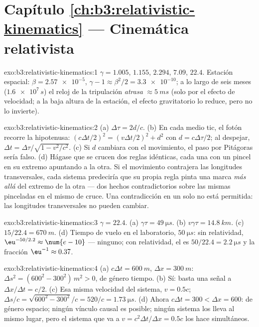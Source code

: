 \section*{Capítulo \ref{ch:b3:relativistic-kinematics} --- Cinemática relativista}

\begin{solution}{exo:b3:relativistic-kinematics:1}
$\gamma = 1.005$, $1.155$, $2.294$, $7.09$, $22.4$. Estación espacial: $\beta =
\num{2.57e-5}$, $\gamma - 1 \approx \beta^2/2 = \num{3.3e-10}$; a lo
largo de seis meses ($\num{1.6e7}{}\,\unit{s}$) el reloj de la tripulación
\emph{atrasa} $\approx\qty{5}{ms}$ (solo por el efecto de velocidad; a la
baja altura de la estación, el efecto gravitatorio lo reduce, pero no lo
invierte).
\end{solution}

\begin{solution}{exo:b3:relativistic-kinematics:2}
(a) $\Delta\tau = 2d/c$. (b) En cada medio tic, el fotón recorre la
hipotenusa: $(c\Delta t/2)^2 = (v\Delta t/2)^2 + d^2$ con $d =
c\Delta\tau/2$; al despejar, $\Delta t = \Delta\tau/\sqrt{1 - v^2/c^2}$. (c)
Si $d$ cambiara con el movimiento, el paso por Pitágoras sería falso. (d)
Hágase que se crucen dos reglas idénticas, cada una con un pincel en su
extremo apuntando a la otra. Si el movimiento contrajera las longitudes
transversales, cada sistema predeciría que su propia regla pinta una marca
\emph{más allá} del extremo de la otra --- dos hechos contradictorios sobre
las mismas pinceladas en el mismo  de cruce. Una contradicción en un
solo  no está permitida: las longitudes transversales no pueden
cambiar.
\end{solution}

\begin{solution}{exo:b3:relativistic-kinematics:3}
$\gamma = 22.4$. (a) $\gamma\tau = \qty{49}{\micro s}$. (b) $v\gamma
\tau = \qty{14.8}{km}$. (c) $15/22.4 = \qty{670}{m}$. (d) Tiempo de vuelo en
el laboratorio, $\qty{50}{\micro s}$: sin relatividad,
$\eu^{-50/2.2} \approx \num{e-10}$ --- ninguno; con relatividad, el
 es $50/22.4 = \qty{2.2}{\micro s}$ y la fracción $\eu^{-1}
\approx 0.37$.
\end{solution}

\begin{solution}{exo:b3:relativistic-kinematics:4}
(a) $c\Delta t = \qty{600}{m}$, $\Delta x = \qty{300}{m}$: $\Delta s^2
= (600^2 - 300^2)\,\unit{m^2} > 0$, de género tiempo. (b) Sí: basta una
señal a $\Delta x/\Delta t = c/2$. (c) Esa misma velocidad del sistema, $v =
0.5c$;  $\Delta s/c = \sqrt{600^2 - 300^2}/c = 520/c =
\qty{1.73}{\micro s}$. (d) Ahora $c\Delta t = 300 < \Delta x = 600$: de
género espacio; ningún vínculo causal es posible; ningún sistema los lleva
al mismo lugar, pero el sistema que va a $v = c^2\Delta t/\Delta x = 0.5c$
los hace simultáneos.
\end{solution}

